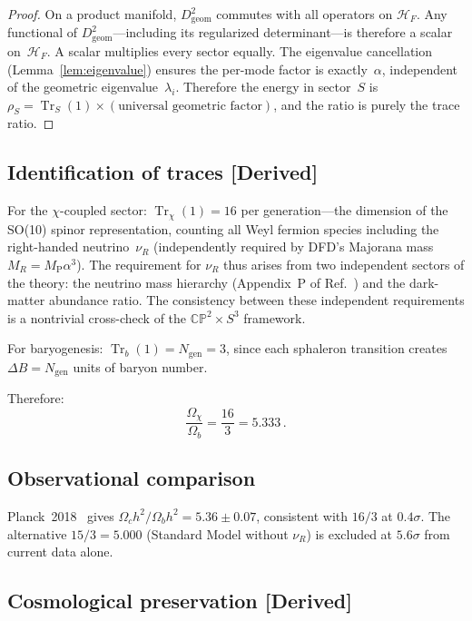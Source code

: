 \documentclass[aps,prd,twocolumn,superscriptaddress,showpacs,floatfix,nofootinbib]{revtex4-2}
\theoremstyle{definition}
\theoremstyle{remark}
\newcommand{\CP}{\mathbb{CP}}
\newcommand{\Sph}{S}
\newcommand{\MP}{M_{\mathrm{P}}}
\newcommand{\Tr}{\operatorname{Tr}}
\newcommand{\Ngen}{N_{\mathrm{gen}}}
\newcommand{\grade}[1]{\textsf{\footnotesize [#1]}}
\begin{document}
\begin{proof}
On a product manifold, $D^2_{\mathrm{geom}}$ commutes with
all operators on $\mathcal{H}_F$. Any functional of
$D^2_{\mathrm{geom}}$---including its regularized
determinant---is therefore a scalar on~$\mathcal{H}_F$.
A scalar multiplies every sector equally. The eigenvalue
cancellation (Lemma~\ref{lem:eigenvalue}) ensures the
per-mode factor is exactly~$\alpha$, independent of the
geometric eigenvalue~$\lambda_i$. Therefore the energy
in sector~$S$ is
$\rho_S = \Tr_S(1)\times(\text{universal geometric factor})$,
and the ratio is purely the trace ratio.
\end{proof}

\subsection{Identification of traces \grade{Derived}}

For the $\chi$-coupled sector:
$\Tr_\chi(1) = 16$ per generation---the dimension of the
SO(10) spinor representation, counting all Weyl fermion
species including the right-handed neutrino~$\nu_R$
(independently required by DFD's Majorana mass
$M_R=\MP\alpha^3$). The requirement for $\nu_R$ thus
arises from two independent sectors of the theory:
the neutrino mass hierarchy (Appendix~P of
Ref.~\cite{Alcock2025}) and the dark-matter abundance
ratio. The consistency between these independent
requirements is a nontrivial cross-check of the
$\CP^2\times\Sph^3$ framework.

For baryogenesis: $\Tr_b(1) = \Ngen = 3$, since each
sphaleron transition creates $\Delta B = \Ngen$ units
of baryon number.

Therefore:
\begin{equation}
\label{eq:163-result}
\frac{\Omega_\chi}{\Omega_b}
= \frac{16}{3} = 5.333\,.
\end{equation}

\subsection{Observational comparison}

Planck~2018~\cite{Planck2018} gives
$\Omega_c h^2/\Omega_b h^2 = 5.36\pm 0.07$, consistent
with $16/3$ at $0.4\sigma$. The alternative
$15/3=5.000$ (Standard Model without $\nu_R$) is
excluded at $5.6\sigma$ from current data alone.

\subsection{Cosmological preservation
\grade{Derived}}
\end{document}
